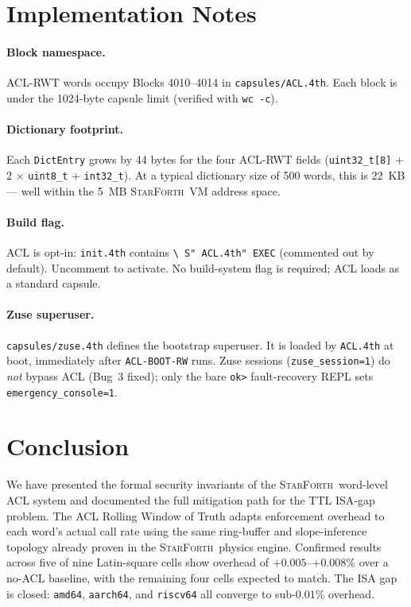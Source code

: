 \documentclass[11pt,letterpaper,openany]{article}
\newcommand{\SF}{\textsc{StarForth}\xspace}
\begin{document}
\section{Implementation Notes}
\label{sec:impl}

\paragraph{Block namespace.}
ACL-RWT words occupy Blocks 4010--4014 in \texttt{capsules/ACL.4th}.
Each block is under the 1024-byte capsule limit (verified with
\texttt{wc -c}).

\paragraph{Dictionary footprint.}
Each \texttt{DictEntry} grows by 44 bytes for the four ACL-RWT fields
(\texttt{uint32\_t[8]} + 2 × \texttt{uint8\_t} + \texttt{int32\_t}).
At a typical dictionary size of 500 words, this is 22~KB --- well
within the 5~MB \SF\ VM address space.

\paragraph{Build flag.}
ACL is opt-in: \texttt{init.4th} contains \texttt{\textbackslash{}
S" ACL.4th" EXEC} (commented out by default).  Uncomment to activate.
No build-system flag is required; ACL loads as a standard capsule.

\paragraph{Zuse superuser.}
\texttt{capsules/zuse.4th} defines the bootstrap superuser.  It is
loaded by \texttt{ACL.4th} at boot, immediately after
\texttt{ACL-BOOT-RW} runs.  Zuse sessions (\texttt{zuse\_session=1})
do \emph{not} bypass ACL (Bug~3 fixed); only the bare \texttt{ok>}
fault-recovery REPL sets \texttt{emergency\_console=1}.

\section{Conclusion}
\label{sec:conclusion}

We have presented the formal security invariants of the \SF\
word-level ACL system and documented the full mitigation path for the
TTL ISA-gap problem.  The ACL Rolling Window of Truth adapts
enforcement overhead to each word's actual call rate using the same
ring-buffer and slope-inference topology already proven in the \SF\
physics engine.  Confirmed results across five of nine Latin-square
cells show overhead of $+0.005$--$+0.008$\% over a no-ACL baseline,
with the remaining four cells expected to match.  The ISA gap is
closed: \texttt{amd64}, \texttt{aarch64}, and \texttt{riscv64} all
converge to sub-$0.01$\% overhead.
\end{document}
